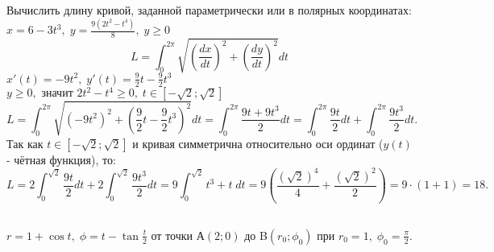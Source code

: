 \section{}
\subsection{}
Вычислить длину кривой, заданной параметрически или в
полярных координатах: \\
$x = 6-3t^3, \; y = \frac{9(2t^2-t^4)}{8}, \; y\geq0$
\[L = \int_0^{2\pi} \sqrt{\left( \frac{dx}{dt} \right)^2 + \left( \frac{dy}{dt} \right)^2}dt\]
\(x'(t) = -9t^2, \; y'(t)= \frac{9}{2}t - \frac{9}{2}t^3\) \\
\(y\geq 0, \text{ значит } 2t^2-t^4 \geq 0, \; t \in [-\sqrt2; \sqrt2]\)
\[L = \int_0^{2\pi} \sqrt{\left( -9t^2 \right )^2 +  \left(\frac{9}{2}t - \frac{9}{2}t^3 \right )^2 } dt = \int_0^{2\pi} \frac{9t+9t^3}{2} dt = \int_0^{2\pi}\frac{9t}{2}dt + \int_0^{2\pi}\frac{9t^3}{2}dt.\]
Так как $t \in [-\sqrt2; \sqrt2]$ и кривая симметрична относительно оси ординат ($y(t)$ - чётная функция), то: 
\[L = 2\int_0^{\sqrt{2}} \frac{9t}{2}dt + 2\int_0^{\sqrt{2}} \frac{9t^3}{2}dt = 9\int_0^{\sqrt{2}}t^3+t \; dt = 9\left(\frac{\left(\sqrt{2}\right)^4}{4} + \frac{\left(\sqrt{2}\right)^2}{2}  \right) = 9\cdot(1 + 1) = 18.\]
\subsection{}
$r = 1 + \cos{t}, \; \phi = t - \tan{\frac{t}{2}}$ от точки А$\left(2; 0\right)$ до B$\left(r_0; \phi_0\right)$ при $r_0 = 1, \; \phi_0 = \frac{\pi}{2}$. \\

